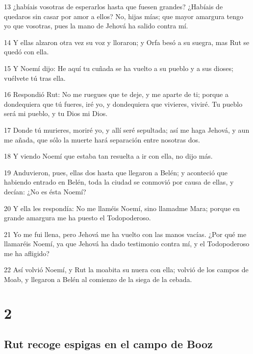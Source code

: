 \par 13 ¿habíais vosotras de esperarlos hasta que fuesen grandes? ¿Habíais de quedaros sin casar por amor a ellos? No, hijas mías; que mayor amargura tengo yo que vosotras, pues la mano de Jehová ha salido contra mí.
\par 14 Y ellas alzaron otra vez su voz y lloraron; y Orfa besó a su suegra, mas Rut se quedó con ella.
\par 15 Y Noemí dijo: He aquí tu cuñada se ha vuelto a su pueblo y a sus dioses; vuélvete tú tras ella.
\par 16 Respondió Rut: No me ruegues que te deje, y me aparte de ti; porque a dondequiera que tú fueres, iré yo, y dondequiera que vivieres, viviré. Tu pueblo será mi pueblo, y tu Dios mi Dios.
\par 17 Donde tú murieres, moriré yo, y allí seré sepultada; así me haga Jehová, y aun me añada, que sólo la muerte hará separación entre nosotras dos. 
\par 18 Y viendo Noemí que estaba tan resuelta a ir con ella, no dijo más.
\par 19 Anduvieron, pues, ellas dos hasta que llegaron a Belén; y aconteció que habiendo entrado en Belén, toda la ciudad se conmovió por causa de ellas, y decían: ¿No es ésta Noemí?
\par 20 Y ella les respondía: No me llaméis Noemí, sino llamadme Mara; porque en grande amargura me ha puesto el Todopoderoso.
\par 21 Yo me fui llena, pero Jehová me ha vuelto con las manos vacías. ¿Por qué me llamaréis Noemí, ya que Jehová ha dado testimonio contra mí, y el Todopoderoso me ha afligido?
\par 22 Así volvió Noemí, y Rut la moabita su nuera con ella; volvió de los campos de Moab, y llegaron a Belén al comienzo de la siega de la cebada.

\chapter{2}

\section*{Rut recoge espigas en el campo de Booz}

